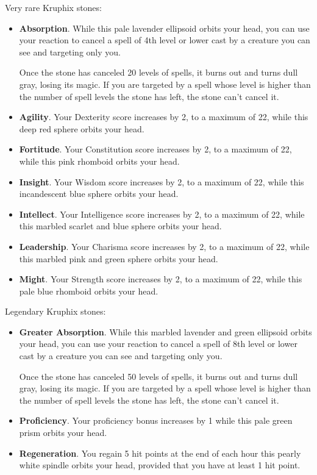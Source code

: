         Very rare Kruphix stones:
        \begin{itemize}
            \item \textbf{Absorption}.
            While this pale lavender ellipsoid orbits your head, you can use your reaction to cancel a spell of 4th level or lower cast by a creature you can see and targeting only you.

            Once the stone has canceled 20 levels of spells, it burns out and turns dull gray, losing its magic.
            If you are targeted by a spell whose level is higher than the number of spell levels the stone has left, the stone can't cancel it.
            \item \textbf{Agility}.
            Your Dexterity score increases by 2, to a maximum of 22, while this deep red sphere orbits your head.
            \item \textbf{Fortitude}.
            Your Constitution score increases by 2, to a maximum of 22, while this pink rhomboid orbits your head.
            \item \textbf{Insight}.
            Your Wisdom score increases by 2, to a maximum of 22, while this incandescent blue sphere orbits your head.
            \item \textbf{Intellect}.
            Your Intelligence score increases by 2, to a maximum of 22, while this marbled scarlet and blue sphere orbits your head.
            \item \textbf{Leadership}.
            Your Charisma score increases by 2, to a maximum of 22, while this marbled pink and green sphere orbits your head.
            \item \textbf{Might}.
            Your Strength score increases by 2, to a maximum of 22, while this pale blue rhomboid orbits your head.
        \end{itemize}

        Legendary Kruphix stones:
        \begin{itemize}
            \item \textbf{Greater Absorption}.
            While this marbled lavender and green ellipsoid orbits your head, you can use your reaction to cancel a spell of 8th level or lower cast by a creature you can see and targeting only you.

            Once the stone has canceled 50 levels of spells, it burns out and turns dull gray, losing its magic.
            If you are targeted by a spell whose level is higher than the number of spell levels the stone has left, the stone can't cancel it.
            \item \textbf{Proficiency}.
            Your proficiency bonus increases by 1 while this pale green prism orbits your head.
            \item \textbf{Regeneration}.
            You regain 5 hit points at the end of each hour this pearly white spindle orbits your head, provided that you have at least 1 hit point.
        \end{itemize}
